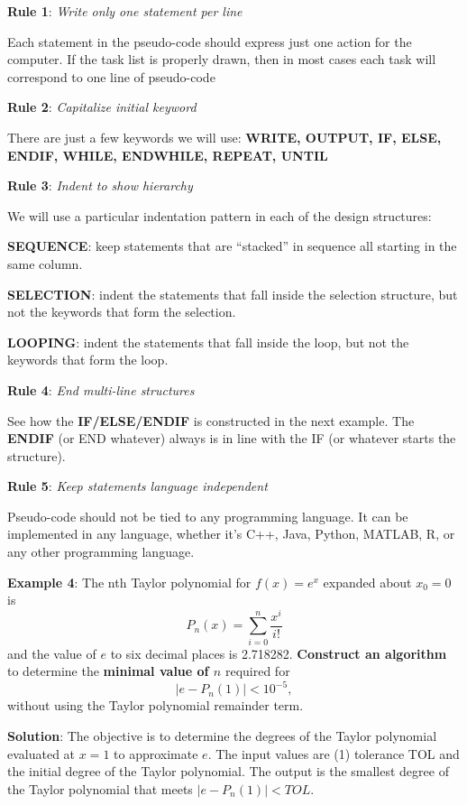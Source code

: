 \documentclass[
]{book}
\begin{document}
\hfill\break

\textbf{Rule 1}: \emph{Write only one statement per line}

Each statement in the pseudo-code should express just one action for the computer. If the task list is properly drawn, then in most cases each task will correspond to one line of pseudo-code

\textbf{Rule 2}: \emph{Capitalize initial keyword}

There are just a few keywords we will use: \textbf{WRITE, OUTPUT, IF, ELSE, ENDIF, WHILE, ENDWHILE, REPEAT, UNTIL}

\textbf{Rule 3}: \emph{Indent to show hierarchy}

We will use a particular indentation pattern in each of the design structures:

\textbf{SEQUENCE}: keep statements that are ``stacked'' in sequence all starting in the same column.

\textbf{SELECTION}: indent the statements that fall inside the selection structure, but not the keywords that form the selection.

\textbf{LOOPING}: indent the statements that fall inside the loop, but not the keywords that form the loop.

\textbf{Rule 4}: \emph{End multi-line structures}

See how the \textbf{IF/ELSE/ENDIF} is constructed in the next example. The \textbf{ENDIF} (or END whatever) always is in line with the IF (or whatever starts the structure).

\textbf{Rule 5}: \emph{Keep statements language independent}

Pseudo-code should not be tied to any programming language. It can be implemented in any language, whether it's C++, Java, Python, MATLAB, R, or any other programming language.

\hfill\break

\textbf{Example 4}: The nth Taylor polynomial for \(f (x) = e^x\) expanded about \(x_0 = 0\) is
\[
P_n(x) =\sum_{i=0}^n \frac{x^i}{i!}
\]
and the value of \(e\) to six decimal places is 2.718282. \textbf{Construct an algorithm} to determine the \textbf{minimal value of \(n\)} required for
\[
|e - P_n(1)| < 10^{-5},
\]
without using the Taylor polynomial remainder term.

\textbf{Solution}: The objective is to determine the degrees of the Taylor polynomial evaluated at \(x = 1\) to approximate \(e\). The input values are (1) tolerance TOL and the initial degree of the Taylor polynomial. The output is the smallest degree of the Taylor polynomial that meets \(|e - P_n(1)| < TOL\).
\end{document}
